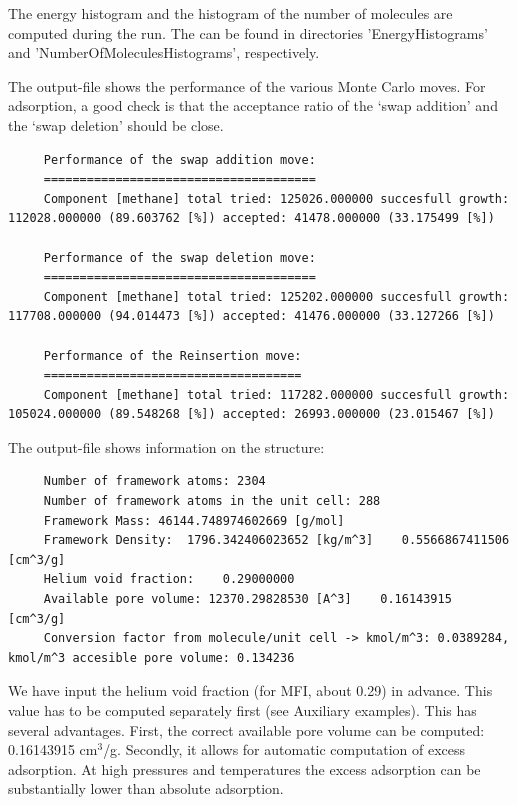 \noindent
The energy histogram and the histogram of the number of molecules are computed during the run.
The can be found in directories 'EnergyHistograms' and 'NumberOfMoleculesHistograms', respectively.

\noindent
The output-file shows the performance of the various Monte Carlo moves. For adsorption, a good check is that the acceptance ratio
of the `swap addition' and the `swap deletion' should be close.
\begin{tiny}
\begin{verbatim}
     Performance of the swap addition move:
     ======================================
     Component [methane] total tried: 125026.000000 succesfull growth: 112028.000000 (89.603762 [%]) accepted: 41478.000000 (33.175499 [%])
     
     Performance of the swap deletion move:
     ======================================
     Component [methane] total tried: 125202.000000 succesfull growth: 117708.000000 (94.014473 [%]) accepted: 41476.000000 (33.127266 [%])
     
     Performance of the Reinsertion move:
     ====================================
     Component [methane] total tried: 117282.000000 succesfull growth: 105024.000000 (89.548268 [%]) accepted: 26993.000000 (23.015467 [%])
\end{verbatim}
\end{tiny}

The output-file shows information on the structure:
\begin{tiny}
\begin{verbatim}
     Number of framework atoms: 2304
     Number of framework atoms in the unit cell: 288
     Framework Mass: 46144.748974602669 [g/mol]
     Framework Density:  1796.342406023652 [kg/m^3]    0.5566867411506 [cm^3/g]
     Helium void fraction:    0.29000000
     Available pore volume: 12370.29828530 [A^3]    0.16143915 [cm^3/g]
     Conversion factor from molecule/unit cell -> kmol/m^3: 0.0389284, kmol/m^3 accesible pore volume: 0.134236
\end{verbatim}
\end{tiny}
We have input the helium void fraction (for MFI, about 0.29) in advance. 
This value has to be computed separately first (see Auxiliary examples).
This has several advantages. First, the correct available
pore volume can be computed: 0.16143915 cm$^3$/g. Secondly, it allows for automatic computation of excess adsorption.
At high pressures and temperatures the excess adsorption can be substantially lower than absolute adsorption.

